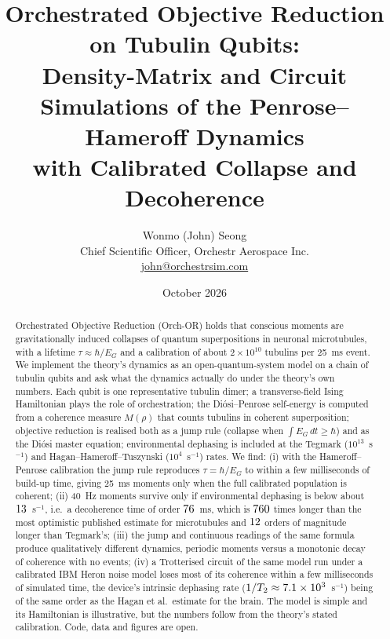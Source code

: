 \documentclass[11pt]{article}
\title{Orchestrated Objective Reduction on Tubulin Qubits:\\Density-Matrix and Circuit Simulations of the Penrose--Hameroff Dynamics\\with Calibrated Collapse and Decoherence}
\author{Wonmo (John) Seong\\ \small Chief Scientific Officer, Orchestr Aerospace Inc.\\ \small \href{mailto:john@orchestrsim.com}{john@orchestrsim.com}}
\date{October 2026}
\begin{document}
\maketitle

\begin{abstract}
Orchestrated Objective Reduction (Orch-OR) holds that conscious moments are gravitationally induced collapses of quantum superpositions in neuronal microtubules, with a lifetime $\tau \approx \hbar/E_G$ and a calibration of about $2\times10^{10}$ tubulins per 25~ms event. We implement the theory's dynamics as an open-quantum-system model on a chain of tubulin qubits and ask what the dynamics actually do under the theory's own numbers. Each qubit is one representative tubulin dimer; a transverse-field Ising Hamiltonian plays the role of orchestration; the Di\'osi--Penrose self-energy is computed from a coherence measure $M(\rho)$ that counts tubulins in coherent superposition; objective reduction is realised both as a jump rule (collapse when $\int E_G\,dt\ge\hbar$) and as the Di\'osi master equation; environmental dephasing is included at the Tegmark ($10^{13}$~s$^{-1}$) and Hagan--Hameroff--Tuszynski ($10^{4}$~s$^{-1}$) rates. We find: (i) with the Hameroff--Penrose calibration the jump rule reproduces $\tau=\hbar/E_G$ to within a few milliseconds of build-up time, giving 25~ms moments only when the full calibrated population is coherent; (ii) 40~Hz moments survive only if environmental dephasing is below about $13$~s$^{-1}$, i.e.\ a decoherence time of order $76$~ms, which is $760$ times longer than the most optimistic published estimate for microtubules and $12$ orders of magnitude longer than Tegmark's; (iii) the jump and continuous readings of the same formula produce qualitatively different dynamics, periodic moments versus a monotonic decay of coherence with no events; (iv) a Trotterised circuit of the same model run under a calibrated IBM Heron noise model loses most of its coherence within a few milliseconds of simulated time, the device's intrinsic dephasing rate ($1/T_2\approx7.1\times10^{3}$~s$^{-1}$) being of the same order as the Hagan et al.\ estimate for the brain. The model is simple and its Hamiltonian is illustrative, but the numbers follow from the theory's stated calibration. Code, data and figures are open.
\end{abstract}
\end{document}
